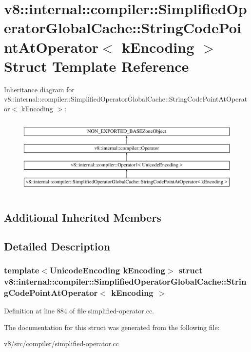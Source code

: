 \hypertarget{structv8_1_1internal_1_1compiler_1_1SimplifiedOperatorGlobalCache_1_1StringCodePointAtOperator}{}\section{v8\+:\+:internal\+:\+:compiler\+:\+:Simplified\+Operator\+Global\+Cache\+:\+:String\+Code\+Point\+At\+Operator$<$ k\+Encoding $>$ Struct Template Reference}
\label{structv8_1_1internal_1_1compiler_1_1SimplifiedOperatorGlobalCache_1_1StringCodePointAtOperator}
Inheritance diagram for v8\+:\+:internal\+:\+:compiler\+:\+:Simplified\+Operator\+Global\+Cache\+:\+:String\+Code\+Point\+At\+Operator$<$ k\+Encoding $>$\+:\begin{figure}[H]
\begin{center}
\leavevmode
\includegraphics[height=3.978686cm]{structv8_1_1internal_1_1compiler_1_1SimplifiedOperatorGlobalCache_1_1StringCodePointAtOperator}
\end{center}
\end{figure}
\subsection*{Additional Inherited Members}


\subsection{Detailed Description}
\subsubsection*{template$<$Unicode\+Encoding k\+Encoding$>$\newline
struct v8\+::internal\+::compiler\+::\+Simplified\+Operator\+Global\+Cache\+::\+String\+Code\+Point\+At\+Operator$<$ k\+Encoding $>$}



Definition at line 884 of file simplified-\/operator.\+cc.



The documentation for this struct was generated from the following file\+:\begin{DoxyCompactItemize}
\item 
v8/src/compiler/simplified-\/operator.\+cc\end{DoxyCompactItemize}
